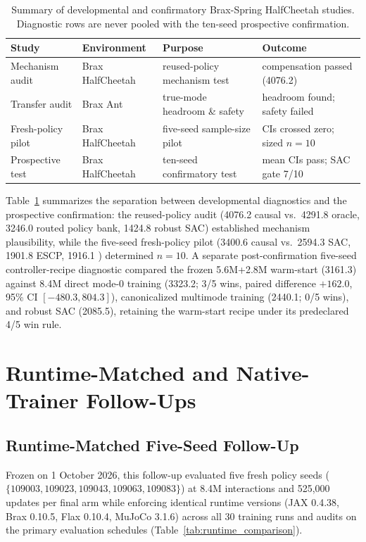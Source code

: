 \begin{table}[ht]
\centering
\caption{Summary of developmental and confirmatory Brax-Spring HalfCheetah studies. Diagnostic rows are never pooled with the ten-seed prospective confirmation.}
\label{tab:development_history}
\small
\begin{tabular}{@{}p{}p{}p{}p{}@{}}
\toprule
Study & Environment & Purpose & Outcome \\
\midrule
Mechanism audit & Brax HalfCheetah & reused-policy mechanism test & compensation passed (4076.2) \\
Transfer audit & Brax Ant & true-mode headroom \& safety & headroom found; safety failed \\
Fresh-policy pilot & Brax HalfCheetah & five-seed sample-size pilot & CIs crossed zero; sized $n=10$ \\
Prospective test & Brax HalfCheetah & ten-seed confirmatory test & mean CIs pass; SAC gate 7/10 \\
\bottomrule
\end{tabular}
\end{table}

Table~\ref{tab:development_history} summarizes the separation between developmental diagnostics and the prospective confirmation: the reused-policy audit (4076.2 causal vs.\ 4291.8 oracle, 3246.0 routed policy bank, 1424.8 robust SAC) established mechanism plausibility, while the five-seed fresh-policy pilot (3400.6 causal vs.\ 2594.3 SAC, 1901.8 ESCP, 1916.1 \resacbaseline{}) determined $n=10$. A separate post-confirmation five-seed controller-recipe diagnostic compared the frozen 5.6M+2.8M warm-start (3161.3) against 8.4M direct mode-0 training (3323.2; 3/5 wins, paired difference $+162.0$, 95\% CI $[-480.3,804.3]$), canonicalized multimode training (2440.1; 0/5 wins), and robust SAC (2085.5), retaining the warm-start recipe under its predeclared 4/5 win rule.

\section{Runtime-Matched and Native-Trainer Follow-Ups}
\label{app:runtime_comparison}

\subsection{Runtime-Matched Five-Seed Follow-Up}

Frozen on 1 October 2026, this follow-up evaluated five fresh policy seeds ($\{109003,109023,109043,109063,109083\}$) at 8.4M interactions and 525,000 updates per final arm while enforcing identical runtime versions (JAX 0.4.38, Brax 0.10.5, Flax 0.10.4, MuJoCo 3.1.6) across all 30 training runs and audits on the primary evaluation schedules (Table~\ref{tab:runtime_comparison}).

